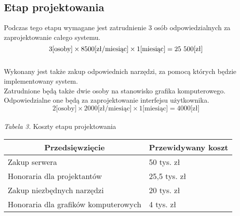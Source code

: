 \documentclass [11pt, a4paper, leqno]	{article}	%
\begin{document}
\subsection{Etap projektowania}
\noindent
Podczas tego etapu wymagane jest zatrudnienie 3 osób odpowiedzialnych za zaprojektowanie całego systemu. \\
\begin{equation}3 \text{[osoby]} \times  8500 \text{[zł/miesiąc]} \times 1 \text{[miesiąc]} = 25\\\ 500 \text{[zł]} \end{equation} \\
Wykonany jest także zakup odpowiednich narzędzi, za pomocą których będzie implementowany system.  \\
Zatrudnione będą także dwie osoby na stanowisko grafika komputerowego. Odpowiedzialne one będą za zaprojektowanie interfejsu użytkownika. \\
\begin{equation}2 \text{[osoby]} \times 2000 \text{[zł/miesiąc]} \times 1 \text{[miesiąc]} = 4000 \text{[zł]} \end{equation} \\
\textit{Tabela 3.} Koszty etapu projektowania

\begin{center}
	\begin{tabular}{| l | l |}
		\hline
		\multicolumn{1}{|c|}{Przedsięwzięcie} & 
		\multicolumn{1}{|c|}{Przewidywany koszt} \\ \hline \hline
		Zakup serwera & 50 tys. zł \\ \hline
		Honoraria dla projektantów & 25,5 tys. zł \\ \hline
		Zakup niezbędnych narzędzi & 20 tys. zł \\ \hline
		Honoraria dla grafików komputerowych & 4 tys. zł \\ \hline
	\end{tabular}
\end{center}
\end{document}
